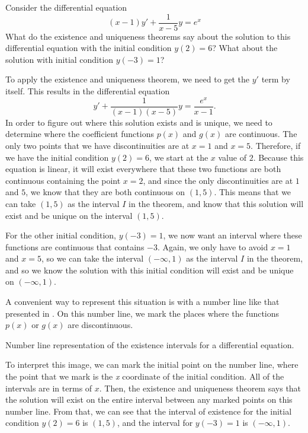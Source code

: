 \begin{example}
Consider the differential equation 
\begin{equation*}
(x-1)y' + \frac{1}{x-5} y = e^x
\end{equation*}
What do the existence and uniqueness theorems say about the solution to this differential equation with the initial condition $y(2) = 6$? What about the solution with initial condition $y(-3) = 1$?
\end{example}

\begin{exampleSol}
To apply the existence and uniqueness theorem, we need to get the $y'$ term by itself. This results in the differential equation
\begin{equation*}
y' + \frac{1}{(x-1)(x-5)} y = \frac{e^x}{x-1}.
\end{equation*}
In order to figure out where this solution exists and is unique, we need to determine where the coefficient functions $p(x)$ and $g(x)$ are continuous. The only two points that we have discontinuities are at $x=1$ and $x=5$. Therefore, if we have the initial condition $y(2) = 6$, we start at the $x$ value of $2$. Because this equation is linear, it will exist everywhere that these two functions are both continuous containing the point $x=2$, and since the only discontinuities are at $1$ and $5$, we know that they are both continuous on $(1,5)$. This means that we can take $(1,5)$ as the interval $I$ in the theorem, and know that this solution will exist and be unique on the interval $(1,5)$. 

For the other initial condition, $y(-3) = 1$, we now want an interval where these functions are continuous that contains $-3$. Again, we only have to avoid $x=1$ and $x=5$, so we can take the interval $(-\infty, 1)$ as the interval $I$ in the theorem, and so we know the solution with this initial condition will exist and be unique on $(-\infty, 1)$. 

A convenient way to represent this situation is with a number line like that presented in . On this number line, we mark the places where the functions $p(x)$ or $g(x)$ are discontinuous. 

\begin{myfig}
\capstart
\caption{Number line representation of the existence intervals for a differential equation.\label{1.5:EUNumberLine}}
\end{myfig}

To interpret this image, we can mark the initial point on the number line, where the point that we mark is the \emph{x} coordinate of the initial condition. All of the intervals are in terms of $x$. Then, the existence and uniqueness theorem says that the solution will exist on the entire interval between any marked points on this number line. From that, we can see that the interval of existence for the initial condition $y(2) = 6$ is $(1,5)$, and the interval for $y(-3) = 1$ is $(-\infty, 1)$. 
\end{exampleSol}

